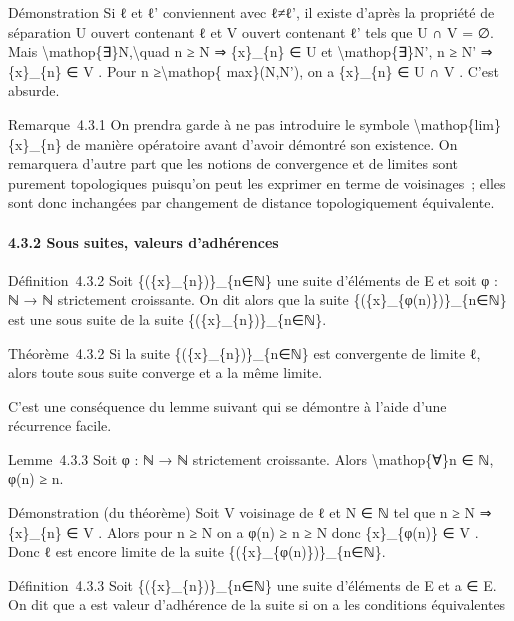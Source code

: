 \documentclass[]{article}
\begin{document}
Démonstration Si ℓ et ℓ' conviennent avec ℓ≠ℓ', il existe d'après la
propriété de séparation U ouvert contenant ℓ et V ouvert contenant ℓ'
tels que U ∩ V = ∅. Mais
\textbackslash{}mathop\{∃\}N,\textbackslash{}quad n ≥ N ⇒ \{x\}\_\{n\} ∈
U et \textbackslash{}mathop\{∃\}N', n ≥ N' ⇒ \{x\}\_\{n\} ∈ V . Pour n
≥\textbackslash{}mathop\{ max\}(N,N'), on a \{x\}\_\{n\} ∈ U ∩ V . C'est
absurde.

Remarque~4.3.1 On prendra garde à ne pas introduire le symbole
\textbackslash{}mathop\{lim\}\{x\}\_\{n\} de manière opératoire avant
d'avoir démontré son existence. On remarquera d'autre part que les
notions de convergence et de limites sont purement topologiques
puisqu'on peut les exprimer en terme de voisinages~; elles sont donc
inchangées par changement de distance topologiquement équivalente.

\paragraph{4.3.2 Sous suites, valeurs d'adhérences}

Définition~4.3.2 Soit \{(\{x\}\_\{n\})\}\_\{n∈ℕ\} une suite d'éléments
de E et soit φ : ℕ → ℕ strictement croissante. On dit alors que la suite
\{(\{x\}\_\{φ(n)\})\}\_\{n∈ℕ\} est une sous suite de la suite
\{(\{x\}\_\{n\})\}\_\{n∈ℕ\}.

Théorème~4.3.2 Si la suite \{(\{x\}\_\{n\})\}\_\{n∈ℕ\} est convergente
de limite ℓ, alors toute sous suite converge et a la même limite.

C'est une conséquence du lemme suivant qui se démontre à l'aide d'une
récurrence facile.

Lemme~4.3.3 Soit φ : ℕ → ℕ strictement croissante. Alors
\textbackslash{}mathop\{∀\}n ∈ ℕ, φ(n) ≥ n.

Démonstration (du théorème) Soit V voisinage de ℓ et N ∈ ℕ tel que n ≥ N
⇒ \{x\}\_\{n\} ∈ V . Alors pour n ≥ N on a φ(n) ≥ n ≥ N donc
\{x\}\_\{φ(n)\} ∈ V . Donc ℓ est encore limite de la suite
\{(\{x\}\_\{φ(n)\})\}\_\{n∈ℕ\}.

Définition~4.3.3 Soit \{(\{x\}\_\{n\})\}\_\{n∈ℕ\} une suite d'éléments
de E et a ∈ E. On dit que a est valeur d'adhérence de la suite si on a
les conditions équivalentes
\end{document}
